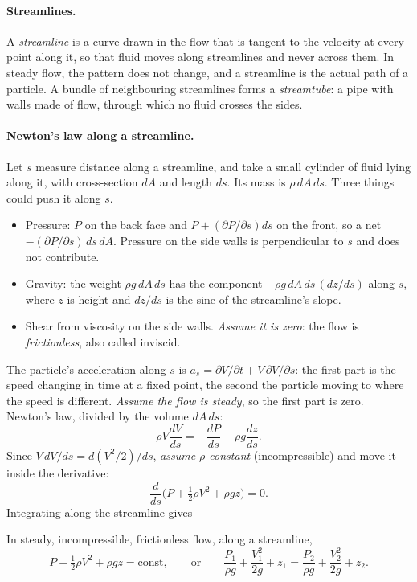 \paragraph{Streamlines.} A \emph{streamline} is a curve drawn in the flow that is tangent to the velocity at every point along it, so that fluid moves along streamlines and never across them. In steady flow, the pattern does not change, and a streamline is the actual path of a particle. A bundle of neighbouring streamlines forms a \emph{streamtube}: a pipe with walls made of flow, through which no fluid crosses the sides.

\paragraph{Newton's law along a streamline.} Let $s$ measure distance along a streamline, and take a small cylinder of fluid lying along it, with cross-section $dA$ and length $ds$. Its mass is $\rho\,dA\,ds$. Three things could push it along $s$.
\begin{itemize}[nosep,leftmargin=*]
\item Pressure: $P$ on the back face and $P + (\partial P/\partial s)ds$ on the front, so a net $-(\partial P/\partial s)\,ds\,dA$. Pressure on the side walls is perpendicular to $s$ and does not contribute.
\item Gravity: the weight $\rho g\,dA\,ds$ has the component $-\rho g\,dA\,ds\,(dz/ds)$ along $s$, where $z$ is height and $dz/ds$ is the sine of the streamline's slope.
\item Shear from viscosity on the side walls. \emph{Assume it is zero}: the flow is \emph{frictionless}, also called inviscid.
\end{itemize}
The particle's acceleration along $s$ is $a_s = \partial V/\partial t + V\,\partial V/\partial s$: the first part is the speed changing in time at a fixed point, the second the particle moving to where the speed is different. \emph{Assume the flow is steady}, so the first part is zero. Newton's law, divided by the volume $dA\,ds$:
\[
\rho V\frac{dV}{ds} = -\frac{dP}{ds} - \rho g\frac{dz}{ds} .
\]
Since $V\,dV/ds = d(V^2/2)/ds$, \emph{assume $\rho$ constant} (incompressible) and move it inside the derivative:
\[
\frac{d}{ds}\Big(P + \tfrac12\rho V^2 + \rho gz\Big) = 0 .
\]
Integrating along the streamline gives

\begin{theorem}[Bernoulli]
In steady, incompressible, frictionless flow, along a streamline,
\[
P + \tfrac12\rho V^2 + \rho gz = \text{const}, \qquad\text{or}\qquad \frac{P_1}{\rho g} + \frac{V_1^2}{2g} + z_1 = \frac{P_2}{\rho g} + \frac{V_2^2}{2g} + z_2 .
\]
\end{theorem}

